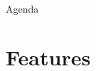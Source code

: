 

{
	\thispagestyle{empty}
	\frame{
  \aauwavesbg
  \finalpage{\insertsection\par}
	}
}
\AtBeginSection{\sectionpage}


{\aauwavesbg
\begin{frame}
\titlepage
\end{frame}}
\begin{frame}{Agenda}{}
{\footnotesize\tableofcontents}
\end{frame}




\section{Features}



